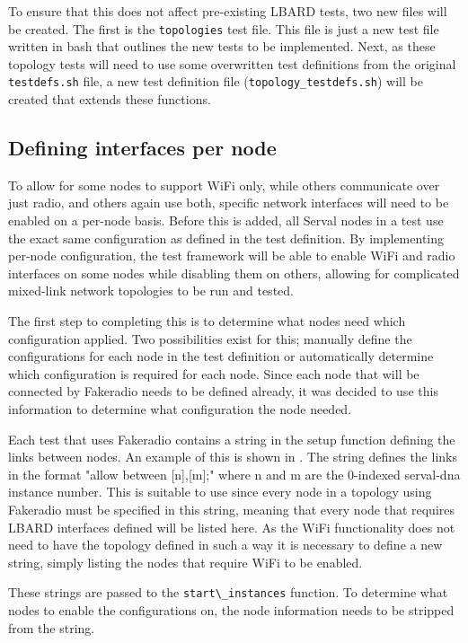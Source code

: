 To ensure that this does not affect pre-existing LBARD tests, two new files will be created.
The first is the \verb|topologies| test file.
This file is just a new test file written in bash that outlines the new tests to be implemented.
Next, as these topology tests will need to use some overwritten test definitions from the original \texttt{testdefs.sh} file, a new test definition file (\texttt{topology\_testdefs.sh}) will be created that extends these functions.



\subsection{Defining interfaces per node}
To allow for some nodes to support WiFi only, while others communicate over just radio, and others again use both, specific network interfaces will need to be enabled on a per-node basis.
Before this is added, all Serval nodes in a test use the exact same configuration as defined in the test definition.
By implementing per-node configuration, the test framework will be able to enable WiFi and radio interfaces on some nodes while disabling them on others, allowing for complicated mixed-link network topologies to be run and tested.

The first step to completing this is to determine what nodes need which configuration applied.
Two possibilities exist for this; manually define the configurations for each node in the test definition or automatically determine which configuration is required for each node.
Since each node that will be connected by Fakeradio needs to be defined already, it was decided to use this information to determine what configuration the node needed.

Each test that uses Fakeradio contains a string in the setup function defining the links between nodes.
An example of this is shown in . 
The string defines the links in the format "allow between [n],[m];" where n and m are the 0-indexed serval-dna instance number.
This is suitable to use since every node in a topology using Fakeradio must be specified in this string, meaning that every node that requires LBARD interfaces defined will be listed here.
As the WiFi functionality does not need to have the topology defined in such a way it is necessary to define a new string, simply listing the nodes that require WiFi to be enabled. 

These strings are passed to the \verb|start\_instances| function. 
To determine what nodes to enable the configurations on, the node information needs to be stripped from the string.


